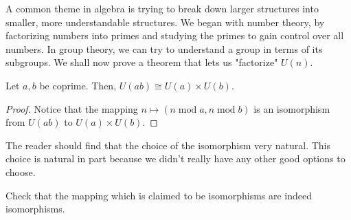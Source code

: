 \documentclass[./algebra-notes.tex]{subfiles}
\begin{document}
A common theme in algebra is trying to break down larger structures into
smaller, more understandable structures. We began with number theory, by
factorizing numbers into primes and studying the primes to gain control over all
numbers. In group theory, we can try to understand a group in terms of its
subgroups. We shall now prove a theorem that lets us "factorize" $U(n)$. 
\begin{theorem}[Structure of $U(n)$]
    Let $a, b$ be coprime. Then, $U(ab) \cong U(a) \times U(b)$.
\end{theorem}
\begin{proof}
    Notice that the mapping $n \mapsto (n \operatorname{mod} a, n
    \operatorname{mod} b)$ is an isomorphism from $U(ab)$ to $U(a) \times U(b)$.
\end{proof}
The reader should find that the choice of the isomorphism very natural. This
choice is natural in part because we didn't really have any other good options
to choose. 
\begin{exercise}
    Check that the mapping which is claimed to be isomorphisms are indeed isomorphisms.
\end{exercise}
\end{document}
